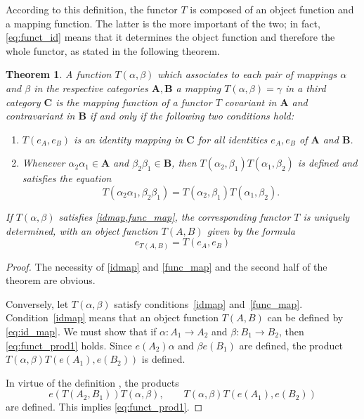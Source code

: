 \documentclass[11pt,a4paper]{report}
\newtheorem{theorem}{Theorem}
\begin{document}
According to this definition, the functor $T$ is composed of an object function and a mapping function. The latter is the
more important of the two; in fact, \cref{eq:funct_id} means that it determines the object function and 
therefore the whole functor, as stated in the following theorem.
\begin{theorem}\label{thm:functor}
	A function $T(\alpha,\beta)$ which associates to each pair of mappings $\alpha$ and $\beta$ in the respective
	categories $\mathbf{A}, \mathbf{B}$ a mapping $T(\alpha,\beta)=\gamma$ in a third category $\mathbf{C}$ is
	the mapping function of a functor $T$ covariant in $\mathbf{A}$ and contravariant in $\mathbf{B}$ if and
	only if the following two conditions hold:
\begin{enumerate}
		\item  $T(e_A,e_B)$ is an identity mapping in $\mathbf{C}$ for all identities $e_A,e_B$ of 
			$\mathbf{A}$ and $\mathbf{B}$.\label{idmap}
		\item  Whenever $\alpha_2\alpha_1\in\mathbf{A}$ and $\beta_2\beta_1\in\mathbf{B}$, then\label{func_map}
			$T(\alpha_2,\beta_1)T(\alpha_1,\beta_2)$ is defined and satisfies the equation
			\begin{equation}
				T(\alpha_2\alpha_1,\beta_2\beta_1)=T(\alpha_2,\beta_1)T(\alpha_1,\beta_2).\label{eq:funct_comp}
			\end{equation}
\end{enumerate}
	If  $T(\alpha,\beta)$ satisfies \cref{idmap,func_map}, the corresponding functor $T$ is uniquely determined, with
	an object function $T(A,B)$ given by the formula
	\begin{equation}\label{eq:id_map}
		e_{T(A,B)}=T(e_A,e_B)
	\end{equation}
\end{theorem}
\begin{proof}
	The necessity of \cref{idmap} and \cref{func_map} and the second half of the theorem are obvious.

	Conversely, let $T(\alpha,\beta)$ satisfy conditions~\ref{idmap} and~\ref{func_map}. Condition~\ref{idmap}
	means that an object function $T(A,B)$ can be defined by \cref{eq:id_map}. We must
	show that if $\alpha: A_1\rightarrow A_2$ and $\beta: B_1\rightarrow B_2$, then \cref{eq:funct_prod1}
	holds. Since $e(A_2)\alpha$ and $\beta e(B_1)$ are defined, the product $T(\alpha,\beta)T(e(A_1),e(B_2))$
	is defined.

	In virtue of the definition , the products
	\begin{equation*}
		e(T(A_2,B_1))T(\alpha,\beta),\qquad T(\alpha,\beta)T(e(A_1),e(B_2))
	\end{equation*}
	are defined. This implies \cref{eq:funct_prod1}. 
\end{proof}
\end{document}
